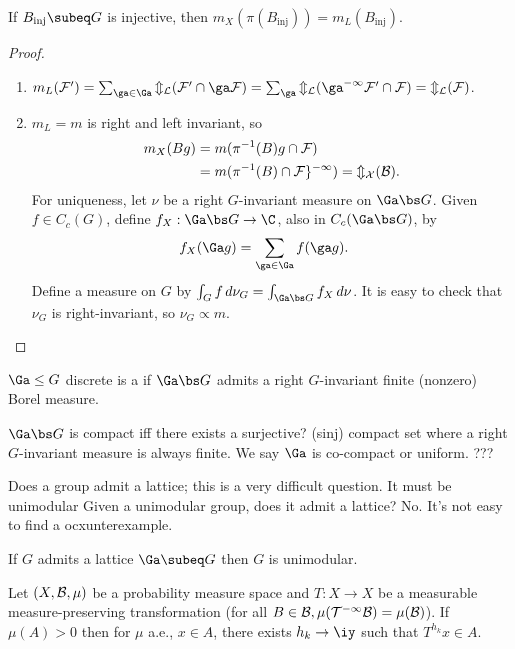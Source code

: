 \begin{cor}
If $B_{\text{inj}}\subeq G$ is injective, then $m_X(\pi(B_{\text{inj}}))=m_L(B_{\text{inj}})$. 
\end{cor}
\begin{proof}
\begin{enumerate}
\item
$m_L(\cal F')= \sum_{\ga \in \Ga} m_L(\cal F' \cap \ga \cal F) = \sum_\ga m_L(\ga^{-1} \cal F'\cap \cal F) = m_L(\cal F)$.
\item
$m_L=m$ is right and left invariant, so
\begin{align}
m_X(Bg) &= m(\pi^{-1}(B) g\cap \cal F)\\
&= m(\pi^{-1}(B)\cap \cal Fg^{-1}) = m_X(B).
\end{align}
For uniqueness, let $\nu$ be a right $G$-invariant measure on $\Ga\bs G$. 
Given $f\in C_c(G)$, define $f_X:\Ga \bs G\to \C$, also in $C_c(\Ga\bs G)$, by
\begin{align}
f_X(\Ga g) &= \sum_{\ga\in \Ga} f(\ga g).
\end{align}
Define a measure on $G$ by $\int_G f \,d\nu_G = \int_{\Ga\bs G} f_X\,d\nu$. It is easy to check that $\nu_G$ is right-invariant, so $\nu_G\propto m$.
\end{enumerate}
\end{proof}
\begin{df}
$\Ga\le G$ discrete is a  if $\Ga\bs G$ admits a right $G$-invariant finite (nonzero) Borel measure.
\end{df}
\begin{rem}
$\Ga\bs G$ is compact iff there exists a surjective? (sinj) compact set where  a right $G$-invariant measure is always finite. We say  $\Ga$ is co-compact or uniform. 
???
\end{rem}
Does a group admit a lattice; this is a very difficult question. It must be unimodular
Given a unimodular group, does it admit a lattice? No. It's not easy to find a ocxunterexample.
\begin{pr}
If $G$ admits a lattice $\Ga \subeq G$ then $G$ is unimodular.
\end{pr}
\begin{thm}
Let $(X,\cal B, \mu)$ be a probability measure space and $T:X\to X$ be a measurable measure-preserving transformation (for all $B\in \cal B, \mu(T^{-1}B) = \mu(B)$). 
If $\mu(A)>0$ then for $\mu$ a.e., $x\in A$, there exists $h_k\to \iy$ such that $T^{h_k}x\in A$. 
\end{thm}
